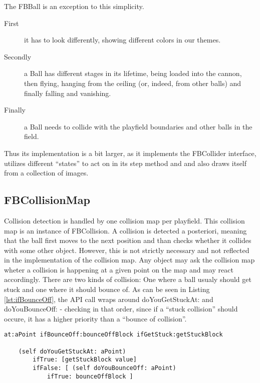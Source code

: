 The FBBall is an exception to this simplicity. 
\begin{description}
  \item[First]
    	it has to look 
	differently, showing different colors in our themes. 
  \item[Secondly]
    	a Ball has different stages in its lifetime, being 
	loaded into the cannon, then flying, hanging from the 
	ceiling (or, indeed, from other balls) and finally falling 
	and vanishing.
  \item[Finally]
    	a Ball needs to collide with the playfield boundaries and 
	other balls in the field.
\end{description}
Thus its implementation is a bit larger, as it implements the FBCollider 
interface, utilizes different ``states'' to act on in its step method and 
and also draws itself from a collection of images.
%
\subsection{FBCollisionMap}
Collision detection is handled by one collision map per playfield. This collision
map is an instance of FBCollision. A collision is detected a posteriori, meaning
that the ball first moves to the next position and  than checks whether it collides
with some other object. However, this is not strictly necessary and not reflected in
the implementation of the collision map. Any object may ask the collision map wheter
a collision is happening at a given point on the map and may react accordingly. There
are two kinds of collision: One where a ball usualy should get stuck and one where it
should bounce of. As can be seen in Listing \ref{lst:ifBounceOff}, the API call wraps
around doYouGetStuckAt: and doYouBounceOff: - checking in that order, since if a ``stuck
collision'' should occure, it has a higher priority than a ``bounce of collision''.

\begin{lstlisting}[caption=API method for detecting collision,label=lst:ifBounceOff]
at:aPoint ifBounceOff:bounceOffBlock ifGetStuck:getStuckBlock
	
	(self doYouGetStuckAt: aPoint)
		ifTrue: [getStuckBlock value]
		ifFalse: [ (self doYouBounceOff: aPoint)
			ifTrue: bounceOffBlock ]
\end{lstlisting}

